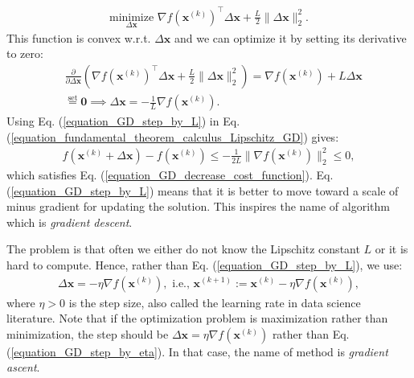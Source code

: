 \documentclass[lang=cn,10pt]{gorgeousnbook}
\numberwithin{equation}{section}%
\numberwithin{figure}{section}%
\begin{document}
\begin{align}\label{equation_GD_min_RHS_of_corollary_fundamental}
\underset{\Delta\boldsymbol{x}}{\text{minimize}}\,\, \nabla f(\boldsymbol{x}^{(k)})^\top \Delta \boldsymbol{x} + \frac{L}{2} \|\Delta \boldsymbol{x}\|_2^2.
\end{align}
This function is convex w.r.t. $\Delta \boldsymbol{x}$ and we can optimize it by setting its derivative to zero:
\begin{align}
&\frac{\partial }{\partial \Delta \boldsymbol{x}} (\nabla f(\boldsymbol{x}^{(k)})^\top \Delta \boldsymbol{x} + \frac{L}{2} \|\Delta \boldsymbol{x}\|_2^2) = \nabla f(\boldsymbol{x}^{(k)}) + L \Delta \boldsymbol{x} \nonumber\\
&\overset{\text{set}}{=} \boldsymbol{0} \implies \Delta \boldsymbol{x} = -\frac{1}{L} \nabla f(\boldsymbol{x}^{(k)}). \label{equation_GD_step_by_L}
\end{align}
Using Eq. (\ref{equation_GD_step_by_L}) in Eq. (\ref{equation_fundamental_theorem_calculus_Lipschitz_GD}) gives:
\begin{align*}
f(\boldsymbol{x}^{(k)} + \Delta \boldsymbol{x}) - f(\boldsymbol{x}^{(k)}) \leq -\frac{1}{2L} \|\nabla f(\boldsymbol{x}^{(k)})\|_2^2 \leq 0,
\end{align*}
which satisfies Eq. (\ref{equation_GD_decrease_cost_function}).
Eq. (\ref{equation_GD_step_by_L}) means that it is better to move toward a scale of minus gradient for updating the solution. This inspires the name of algorithm which is \textit{gradient descent}. 

The problem is that often we either do not know the Lipschitz constant $L$ or it is hard to compute. Hence, rather than Eq. (\ref{equation_GD_step_by_L}), we use:
\begin{align}\label{equation_GD_step_by_eta}
\Delta \boldsymbol{x} = -\eta \nabla f(\boldsymbol{x}^{(k)}), \text{ i.e., } \boldsymbol{x}^{(k+1)} := \boldsymbol{x}^{(k)} - \eta \nabla f(\boldsymbol{x}^{(k)}),
\end{align}
where $\eta > 0$ is the step size, also called the learning rate in data science literature. 
Note that if the optimization problem is maximization rather than minimization, the step should be $\Delta \boldsymbol{x} = \eta \nabla f(\boldsymbol{x}^{(k)})$ rather than Eq. (\ref{equation_GD_step_by_eta}). In that case, the name of method is \textit{gradient ascent}. 
\end{document}

